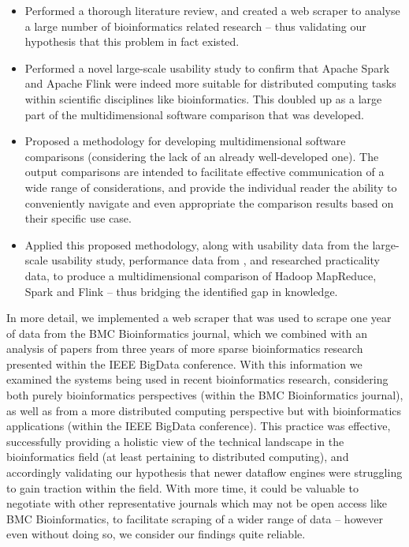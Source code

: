   \begin{itemize}
    \item Performed a thorough literature review, and created a web scraper to analyse a large number of bioinformatics related research -- thus validating our hypothesis that this problem in fact existed.
    \item Performed a novel large-scale usability study to confirm that Apache Spark and Apache Flink were indeed more suitable for distributed computing tasks within scientific disciplines like bioinformatics. This doubled up as a large part of the multidimensional software comparison that was developed.
    \item Proposed a methodology for developing multidimensional software comparisons (considering the lack of an already well-developed one). The output comparisons are intended to facilitate effective communication of a wide range of considerations, and provide the individual reader the ability to conveniently navigate and even appropriate the comparison results based on their specific use case.
    \item Applied this proposed methodology, along with usability data from the large-scale usability study, performance data from \citeauthor{VEIGA:EVALUATION:2015} \cite{VEIGA:EVALUATION:2015}, and researched practicality data, to produce a multidimensional comparison of Hadoop MapReduce, Spark and Flink -- thus bridging the identified gap in knowledge.
  \end{itemize} \medskip
  

  In more detail, we implemented a web scraper that was used to scrape one year of data from the BMC Bioinformatics journal, which we combined with an analysis of papers from three years of more sparse bioinformatics research presented within the IEEE BigData conference. With this information we examined the systems being used in recent bioinformatics research, considering both purely bioinformatics perspectives (within the BMC Bioinformatics journal), as well as from a more distributed computing perspective but with bioinformatics applications (within the IEEE BigData conference). This practice was effective, successfully providing a holistic view of the technical landscape in the bioinformatics field (at least pertaining to distributed computing), and accordingly validating our hypothesis that newer dataflow engines were struggling to gain traction within the field. With more time, it could be valuable to negotiate with other representative journals which may not be open access like BMC Bioinformatics, to facilitate scraping of a wider range of data -- however even without doing so, we consider our findings quite reliable. \medskip
  

